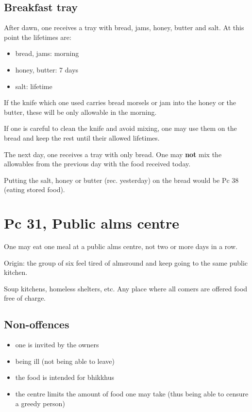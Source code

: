 \subsection{Breakfast tray}

After dawn, one receives a tray with bread, jams, honey, butter and
salt. At this point the lifetimes are:

\begin{itemize}
\tightlist
\item
  bread, jams: morning
\item
  honey, butter: 7 days
\item
  salt: lifetime
\end{itemize}

If the knife which one used carries bread morsels or jam into the honey
or the butter, these will be only allowable in the morning.

If one is careful to clean the knife and avoid mixing, one may use them
on the bread and keep the rest until their allowed lifetimes.

The next day, one receives a tray with only bread. One may \textbf{not}
mix the allowables from the previous day with the food received today.

Putting the salt, honey or butter (rec. yesterday) on the bread would be
Pc 38 (eating stored food).

\section{Pc 31, Public alms centre}

One may eat one meal at a public alms centre, not two or more days in a
row.

Origin: the group of six feel tired of almsround and keep going to the
same public kitchen.

Soup kitchens, homeless shelters, etc. Any place where all comers are
offered food free of charge.

\subsection{Non-offences}

\begin{itemize}
\tightlist
\item
  one is invited by the owners
\item
  being ill (not being able to leave)
\item
  the food is intended for bhikkhus
\item
  the centre limits the amount of food one may take (thus being able to
  censure a greedy person)
\end{itemize}


